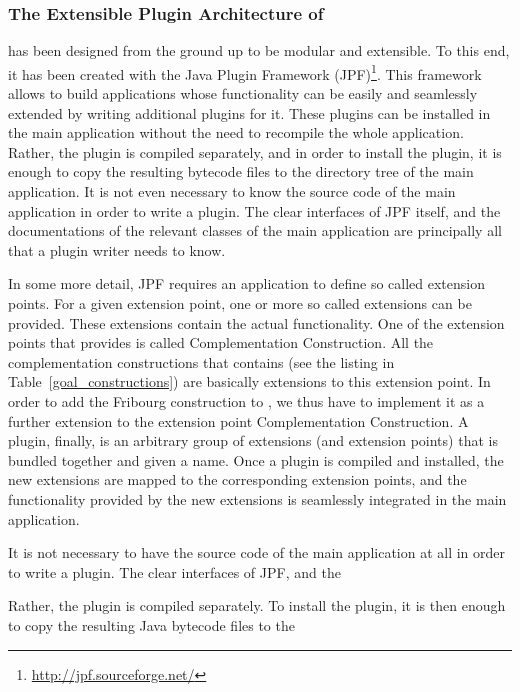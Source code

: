 \subsubsection{The Extensible Plugin Architecture of \goal}
\goal{} has been designed from the ground up to be modular and extensible. To this end, it has been created with the Java Plugin Framework (JPF)\footnote{\url{http://jpf.sourceforge.net/}}. This framework allows to build applications whose functionality can be easily and seamlessly extended by writing additional plugins for it. These plugins can be installed in the main application without the need to recompile the whole application. Rather, the plugin is compiled separately, and in order to install the plugin, it is enough to copy the resulting bytecode files to the directory tree of the main application. It is not even necessary to know the source code of the main application in order to write a plugin. The clear interfaces of JPF itself, and the documentations of the relevant classes of the main application are principally all that a plugin writer needs to know.

In some more detail, JPF requires an application to define so called extension points. For a given extension point, one or more so called extensions can be provided. These extensions contain the actual functionality. One of the extension points that \goal{} provides is called \textsf{Complementation Construction}. All the complementation constructions that \goal{} contains (see the listing in Table~\ref{goal_constructions}) are basically extensions to this extension point. In order to add the Fribourg construction to \goal{}, we thus have to implement it as a further extension to the extension point \textsf{Complementation Construction}. A plugin, finally, is an arbitrary group of extensions (and extension points) that is bundled together and given a name. Once a plugin is compiled and installed, the new extensions are mapped to the corresponding extension points, and the functionality provided by the new extensions is seamlessly integrated in the main application.



 It is not necessary to have the source code of the main application at all in order to write a plugin. The clear interfaces of JPF, and the 



 Rather, the plugin is compiled separately. To install the plugin, it is then enough to copy the resulting Java bytecode files to the 


